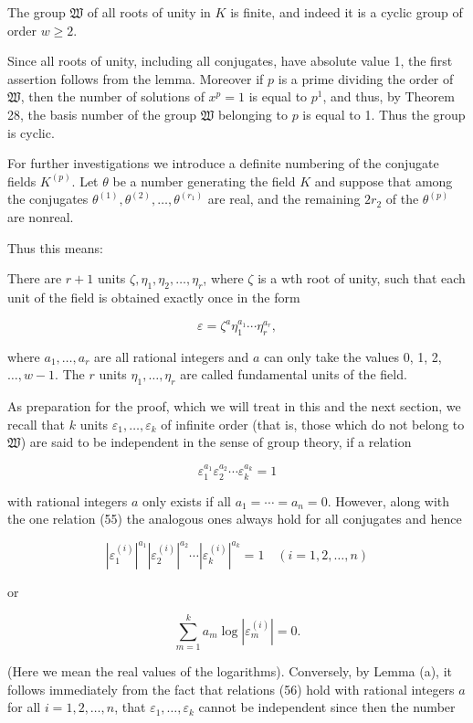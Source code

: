 The group $\mathfrak{W}$ of all roots of unity in $K$ is finite, and indeed it is a cyclic group of order $w \geq 2$.

Since all roots of unity, including all conjugates, have absolute value 1, the first assertion follows from the lemma. Moreover if $p$ is a prime dividing the order of $\mathfrak{W}$, then the number of solutions of $x^p = 1$ is equal to $p^1$, and thus, by Theorem 28, the basis number of the group $\mathfrak{W}$ belonging to $p$ is equal to 1. Thus the group is cyclic.

For further investigations we introduce a definite numbering of the conjugate fields $K^{(p)}$. Let $\theta$ be a number generating the field $K$ and suppose that among the conjugates $\theta^{(1)}, \theta^{(2)}, \ldots, \theta^{(r_1)}$ are real, and the remaining $2r_2$ of the $\theta^{(p)}$ are nonreal.

Thus this means:

There are $r + 1$ units $\zeta, \eta_1, \eta_2, \ldots, \eta_r$, where $\zeta$ is a wth root of unity, such that each unit of the field is obtained exactly once in the form

$$\varepsilon = \zeta^a \eta_1^{a_1} \cdots \eta_r^{a_r},$$

where $a_1, \ldots, a_r$ are all rational integers and $a$ can only take the values 0, 1, 2, $\ldots, w - 1$. The $r$ units $\eta_1, \ldots, \eta_r$ are called fundamental units of the field.

As preparation for the proof, which we will treat in this and the next section, we recall that $k$ units $\varepsilon_1, \ldots, \varepsilon_k$ of infinite order (that is, those which do not belong to $\mathfrak{W}$) are said to be independent in the sense of group theory, if a relation

$$\varepsilon_1^{a_1} \varepsilon_2^{a_2} \cdots \varepsilon_k^{a_k} = 1$$

with rational integers $a$ only exists if all $a_1 = \cdots = a_n = 0$. However, along with the one relation (55) the analogous ones always hold for all conjugates and hence

$$|\varepsilon_1^{(i)}|^{a_1} |\varepsilon_2^{(i)}|^{a_2} \cdots |\varepsilon_k^{(i)}|^{a_k} = 1 \quad (i = 1, 2, \ldots, n)$$

or

$$\sum_{m=1}^{k} a_m \log|\varepsilon_m^{(i)}| = 0.$$

(Here we mean the real values of the logarithms). Conversely, by Lemma (a), it follows immediately from the fact that relations (56) hold with rational integers $a$ for all $i = 1, 2, \ldots, n$, that $\varepsilon_1, \ldots, \varepsilon_k$ cannot be independent since then the number

